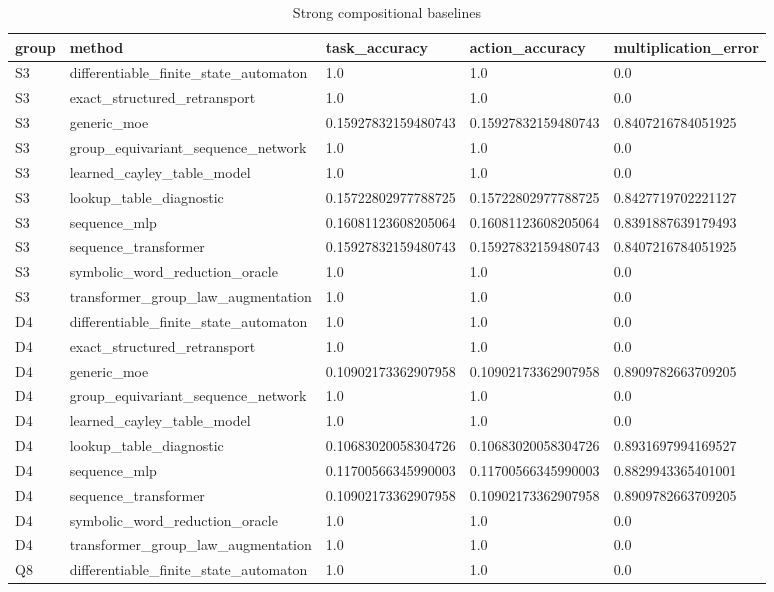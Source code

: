 \begin{table}[t]
\centering
\caption{Strong compositional baselines}
\begin{tabular}{lllll}
\toprule
group & method & task\_accuracy & action\_accuracy & multiplication\_error \\
\midrule
S3 & differentiable\_finite\_state\_automaton & 1.0 & 1.0 & 0.0 \\
S3 & exact\_structured\_retransport & 1.0 & 1.0 & 0.0 \\
S3 & generic\_moe & 0.15927832159480743 & 0.15927832159480743 & 0.8407216784051925 \\
S3 & group\_equivariant\_sequence\_network & 1.0 & 1.0 & 0.0 \\
S3 & learned\_cayley\_table\_model & 1.0 & 1.0 & 0.0 \\
S3 & lookup\_table\_diagnostic & 0.15722802977788725 & 0.15722802977788725 & 0.8427719702221127 \\
S3 & sequence\_mlp & 0.16081123608205064 & 0.16081123608205064 & 0.8391887639179493 \\
S3 & sequence\_transformer & 0.15927832159480743 & 0.15927832159480743 & 0.8407216784051925 \\
S3 & symbolic\_word\_reduction\_oracle & 1.0 & 1.0 & 0.0 \\
S3 & transformer\_group\_law\_augmentation & 1.0 & 1.0 & 0.0 \\
D4 & differentiable\_finite\_state\_automaton & 1.0 & 1.0 & 0.0 \\
D4 & exact\_structured\_retransport & 1.0 & 1.0 & 0.0 \\
D4 & generic\_moe & 0.10902173362907958 & 0.10902173362907958 & 0.8909782663709205 \\
D4 & group\_equivariant\_sequence\_network & 1.0 & 1.0 & 0.0 \\
D4 & learned\_cayley\_table\_model & 1.0 & 1.0 & 0.0 \\
D4 & lookup\_table\_diagnostic & 0.10683020058304726 & 0.10683020058304726 & 0.8931697994169527 \\
D4 & sequence\_mlp & 0.11700566345990003 & 0.11700566345990003 & 0.8829943365401001 \\
D4 & sequence\_transformer & 0.10902173362907958 & 0.10902173362907958 & 0.8909782663709205 \\
D4 & symbolic\_word\_reduction\_oracle & 1.0 & 1.0 & 0.0 \\
D4 & transformer\_group\_law\_augmentation & 1.0 & 1.0 & 0.0 \\
Q8 & differentiable\_finite\_state\_automaton & 1.0 & 1.0 & 0.0 \\

\end{tabular}
\end{table}
